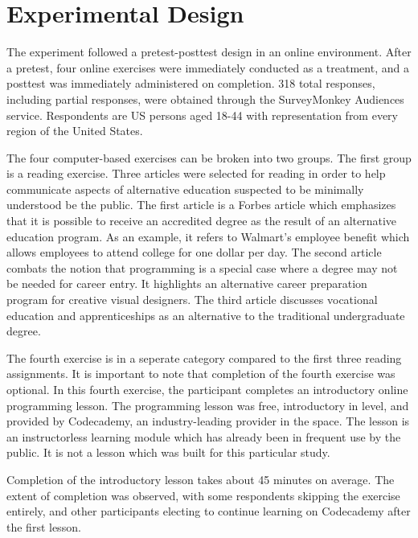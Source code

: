 \documentclass[review]{elsarticle}
\begin{document}
    \section{Experimental Design}

    The experiment followed a pretest-posttest design in an online environment.
    After a pretest, four online exercises were immediately conducted as a treatment, and a posttest was immediately administered on completion.
    318 total responses, including partial responses, were obtained through the SurveyMonkey Audiences service.
    Respondents are US persons aged 18-44 with representation from every region of the United States.


    The four computer-based exercises can be broken into two groups.
    The first group is a reading exercise.
    Three articles were selected for reading in order to help communicate aspects of alternative education suspected to be minimally understood be the public.
    The first article is a Forbes article\cite{friedman_2019} which emphasizes that it is possible to receive an accredited degree as the result of an alternative education program.
    As an example, it refers to Walmart's employee benefit which allows employees to attend college for one dollar per day.
    The second article combats the notion that programming is a special case where a degree may not be needed for career entry.
    It highlights an alternative career preparation program for creative visual designers.
    The third article discusses vocational education and apprenticeships as an alternative to the traditional undergraduate degree.

    The fourth exercise is in a seperate category compared to the first three reading assignments.
    It is important to note that completion of the fourth exercise was optional.
    In this fourth exercise, the participant completes an introductory online programming lesson.
    The programming lesson was free, introductory in level, and provided by Codecademy, an industry-leading provider in the space.
    The lesson is an instructorless learning module which has already been in frequent use by the public.
    It is not a lesson which was built for this particular study.

    Completion of the introductory lesson takes about 45 minutes on average.
    The extent of completion was observed, with some respondents skipping the exercise entirely,
    and other participants electing to continue learning on Codecademy after the first lesson.
    
\end{document}
